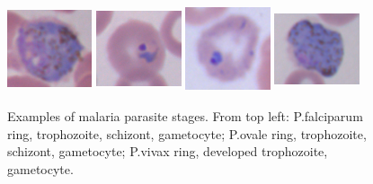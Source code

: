 \documentclass[sensors,review,submit,moreauthors,pdftex,10pt,a4paper]{mdpi}
\begin{document}
\begin{figure}[!t]
	\includegraphics[width=2.5cm, height=2.5cm]{img/ovale_4_gametocyte}
	\includegraphics[width=2.5cm, height=2.5cm]{img/vivax_1_ring}
	\includegraphics[width=2.5cm, height=2.5cm]{img/vivax_2c_trophozoiteDeveloped}
	\includegraphics[width=2.5cm, height=2.5cm]{img/vivax_4_gametocyte}
	\caption{\label{fig:malaria_stages}Examples of malaria parasite stages. From top left: P.falciparum ring, trophozoite, schizont, gametocyte;
		P.ovale ring, trophozoite, schizont, gametocyte; P.vivax ring, developed trophozoite, gametocyte. \cite{Tek2010}}
\end{figure}
\fi
\end{document}
